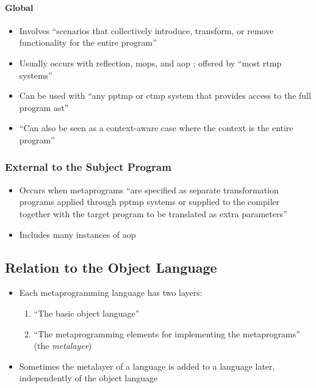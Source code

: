 \paragraph{Global \cite[p.~113:26]{lilis_survey_2019}}
\begin{itemize}
      \item Involves ``scenarios that collectively introduce, transform, or
            remove functionality for the entire program''
            \cite[p.~113:26]{lilis_survey_2019}
      \item Usually occurs with reflection, \acsp{mop}, and \acs{aop}
            \cite[p.~113:26]{lilis_survey_2019}; offered by ``most \acs{rtmp}
            systems'' \cite[p.~113:31]{lilis_survey_2019}
      \item Can be used with ``any \acs{pptmp} or \acs{ctmp} system that
            provides access to the full program \acs{ast}''
            \cite[p.~113:26]{lilis_survey_2019}
      \item ``Can also be seen as a context-aware case where the context is the
            entire program'' \cite[p.~113:26]{lilis_survey_2019}
\end{itemize}

\subsubsection{External to the Subject Program \cite[p.~113:27]{lilis_survey_2019}}
\begin{itemize}
      \item Occurs when metaprograms ``are specified as separate transformation
            programs applied through \acs{pptmp} systems or supplied to the
            compiler together with the target program to be translated as extra
            parameters'' \cite[p.~113:27]{lilis_survey_2019}
      \item Includes many instances of \acs{aop} \cite[p.~113:27]{lilis_survey_2019}
\end{itemize}

\subsection{Relation to the Object Language}
\begin{itemize}
      \item Each metaprogramming language has two layers:
            \begin{enumerate}
                  \item ``The basic object language''
                  \item ``The metaprogramming elements for implementing the
                        metaprograms'' (the \emph{metalayer})
                        \cite[p.~113:27]{lilis_survey_2019}
            \end{enumerate}
      \item Sometimes the metalayer of a language is added to a language later,
            independently of the object language \cite[p.~113:27]{lilis_survey_2019}
\end{itemize}

